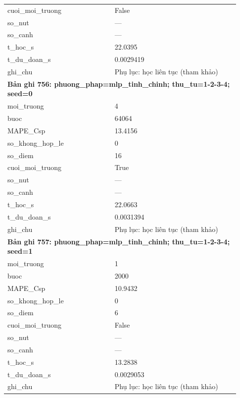 \begin{longtable}{p{0.43\linewidth}p{0.50\linewidth}}
cuoi\_\allowbreak moi\_\allowbreak truong & False \\
so\_\allowbreak nut & — \\
so\_\allowbreak canh & — \\
t\_\allowbreak hoc\_\allowbreak s & 22.0395 \\
t\_\allowbreak du\_\allowbreak doan\_\allowbreak s & 0.0029419 \\
ghi\_\allowbreak chu & Phụ lục: học liên tục (tham khảo) \\
\midrule
\multicolumn{2}{p{0.95\linewidth}}{\textbf{Bản ghi 756: phuong\_phap=mlp\_tinh\_chinh; thu\_tu=1-2-3-4; seed=0}} \\
moi\_\allowbreak truong & 4 \\
buoc & 64064 \\
MAPE\_\allowbreak Csp & 13.4156 \\
so\_\allowbreak khong\_\allowbreak hop\_\allowbreak le & 0 \\
so\_\allowbreak diem & 16 \\
cuoi\_\allowbreak moi\_\allowbreak truong & True \\
so\_\allowbreak nut & — \\
so\_\allowbreak canh & — \\
t\_\allowbreak hoc\_\allowbreak s & 22.0663 \\
t\_\allowbreak du\_\allowbreak doan\_\allowbreak s & 0.0031394 \\
ghi\_\allowbreak chu & Phụ lục: học liên tục (tham khảo) \\
\midrule
\multicolumn{2}{p{0.95\linewidth}}{\textbf{Bản ghi 757: phuong\_phap=mlp\_tinh\_chinh; thu\_tu=1-2-3-4; seed=1}} \\
moi\_\allowbreak truong & 1 \\
buoc & 2000 \\
MAPE\_\allowbreak Csp & 10.9432 \\
so\_\allowbreak khong\_\allowbreak hop\_\allowbreak le & 0 \\
so\_\allowbreak diem & 6 \\
cuoi\_\allowbreak moi\_\allowbreak truong & False \\
so\_\allowbreak nut & — \\
so\_\allowbreak canh & — \\
t\_\allowbreak hoc\_\allowbreak s & 13.2838 \\
t\_\allowbreak du\_\allowbreak doan\_\allowbreak s & 0.0029053 \\
ghi\_\allowbreak chu & Phụ lục: học liên tục (tham khảo) \\

\end{longtable}
